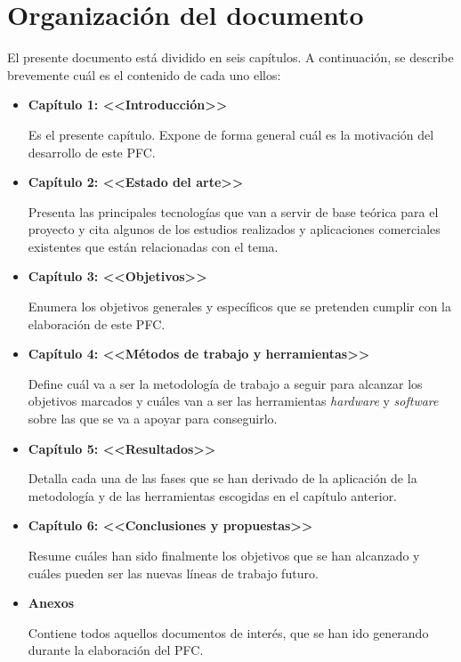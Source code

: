 \section{Organización del documento}
El presente documento está dividido en seis capítulos. A continuación, se
describe brevemente cuál es el contenido de cada uno ellos:
\begin{itemize}
\item \textbf{Capítulo 1: <<Introducción>>}

Es el presente capítulo. Expone de forma general cuál es la motivación del
desarrollo de este \acs{PFC}.

\item \textbf{Capítulo 2: <<Estado del arte>>}

Presenta las principales tecnologías que van a servir de base teórica para el 
proyecto y cita algunos de los estudios realizados y aplicaciones 
comerciales existentes que están relacionadas con el tema.

\item \textbf{Capítulo 3: <<Objetivos>>}

Enumera los objetivos generales y específicos que se pretenden cumplir con la  
elaboración de este \acs{PFC}.

\item \textbf{Capítulo 4: <<Métodos de trabajo y herramientas>>}

Define cuál va a ser la metodología de trabajo a seguir para
alcanzar los objetivos marcados y cuáles van a ser las herramientas
\emph{hardware} y \emph{software} sobre las que se va a apoyar para
conseguirlo.

\item \textbf{Capítulo 5: <<Resultados>>}

Detalla cada una de las fases que se han derivado de la aplicación de la
metodología y de las herramientas escogidas en el capítulo anterior.

\item \textbf{Capítulo 6: <<Conclusiones y propuestas>>}

Resume cuáles han sido finalmente los objetivos que se han alcanzado y cuáles
pueden ser las nuevas líneas de trabajo futuro.

\item \textbf{Anexos}

Contiene todos aquellos documentos de interés, que se han ido generando durante 
la elaboración del \acs{PFC}.

\end{itemize}

